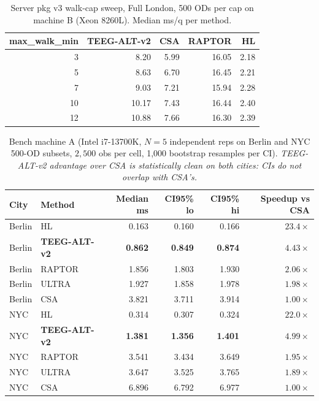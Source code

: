 \documentclass[letterpaper]{article}
\begin{document}
\begin{table}[H]
\centering
\caption{Server pkg v3 walk-cap sweep, Full London, 500 ODs per cap
on machine B (Xeon 8260L). Median ms/q per method.}
\label{tab:walkcap-sweep-v3}
\small
\begin{tabular}{rrrrr}
\toprule
max\_walk\_min & TEEG-ALT-v2 & CSA & RAPTOR & HL \\
\midrule
 3 &  8.20 & 5.99 & 16.05 & 2.18 \\
 5 &  8.63 & 6.70 & 16.45 & 2.21 \\
 7 &  9.03 & 7.21 & 15.94 & 2.28 \\
10 & 10.17 & 7.43 & 16.44 & 2.40 \\
12 & 10.88 & 7.66 & 16.30 & 2.39 \\
\bottomrule
\end{tabular}
\end{table}

\begin{table}[H]
\centering
\caption{Bench machine A (Intel i7-13700K, $N\!=\!5$ independent
reps on Berlin and NYC 500-OD subsets, $2{,}500$ obs per cell, 1{,}000
bootstrap resamples per CI). \emph{TEEG-ALT-v2 advantage over CSA
is statistically clean on both cities: CIs do not overlap with CSA's.}}
\label{tab:multirep-berlin-nyc}
\small
\begin{tabular}{llrrrr}
\toprule
City & Method & Median ms & CI95\% lo & CI95\% hi & Speedup vs CSA \\
\midrule
Berlin & HL              & 0.163  & 0.160  & 0.166  & $23.4\times$ \\
Berlin & \textbf{TEEG-ALT-v2}    & \textbf{0.862}  & \textbf{0.849}  & \textbf{0.874}  & $\mathbf{4.43\times}$ \\
Berlin & RAPTOR          & 1.856  & 1.803  & 1.930  & $2.06\times$ \\
Berlin & ULTRA           & 1.927  & 1.858  & 1.978  & $1.98\times$ \\
Berlin & CSA             & 3.821  & 3.711  & 3.914  & $1.00\times$ \\
\midrule
NYC    & HL              & 0.314  & 0.307  & 0.324  & $22.0\times$ \\
NYC    & \textbf{TEEG-ALT-v2}    & \textbf{1.381}  & \textbf{1.356}  & \textbf{1.401}  & $\mathbf{4.99\times}$ \\
NYC    & RAPTOR          & 3.541  & 3.434  & 3.649  & $1.95\times$ \\
NYC    & ULTRA           & 3.647  & 3.525  & 3.765  & $1.89\times$ \\
NYC    & CSA             & 6.896  & 6.792  & 6.977  & $1.00\times$ \\
\bottomrule
\end{tabular}
\end{table}



\end{document}
